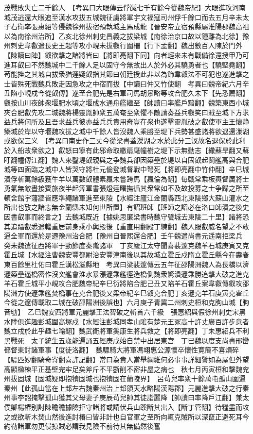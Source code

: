 茂戰敗失亡二千餘人　【考異曰大眼傳云俘馘七千有餘今從魏帝紀】大眼進攻河南城茂逃還大眼追至漢水攻拔五城魏征虜將軍宇文福寇司州俘千餘口而去五月辛未太子右衛率張惠紹等侵魏徐州拔宿預執城主馬成龍【晉安帝立宿預縣屬淮陽郡魏高祖以為南徐州治所】乙亥北徐州刺史昌義之拔梁城【南徐治京口故以鍾離為北徐】豫州刺史韋叡遣長史王超等攻小峴未拔叡行圍柵【行下孟翻】魏出數百人陳於門外【陳讀曰陣】叡欲擊之諸將皆曰【將即亮翻下同】向者輕來未有戰備徐還授甲乃可進耳叡曰不然魏城中二千餘人足以固守今無故出人於外必其驍勇者也【驍堅堯翻】苟能挫之其城自拔衆猶遲疑叡指其節曰朝廷授此非以為飾韋叡法不可犯也遂進擊之士皆殊死戰魏兵敗走因急攻之中宿而拔【中讀曰仲又竹使翻　考異曰魏帝紀六月辛丑陷小峴戍今從叡傳】遂至合肥先是右軍司馬胡景略等攻合肥久未下【先悉薦翻】叡按山川夜帥衆堰肥水頃之堰成水通舟艦繼至【帥讀曰率艦戶黯翻】魏築東西小城夾合肥叡先攻二城魏將楊靈胤帥衆五萬奄至衆懼不敵請奏益兵叡笑曰賊至城下方求益兵將何所及且吾求益兵彼亦益兵兵貴用奇豈在衆也遂擊靈胤破之叡使軍主王懷静築城於岸以守堰魏攻拔之城中千餘人皆沒魏人乘勝至堤下兵勢甚盛諸將欲退還漅湖或欲保三义　【考異曰南史作三丈今從梁書蓋漅湖之水於此分三汊故名退保於此利於入船故衆欲之】叡怒曰寧有此邪命取繖扇麾幢樹之堤下示無動志【繖蘇旱翻又蘇盱翻幢傳江翻】魏人來鑿堤叡親與之争魏兵卻因築壘於堤以自固叡起鬬艦高與合肥城等四面臨之城中人皆哭守將杜元倫登城督戰中弩死【將即亮翻中竹仲翻】辛巳城潰俘斬萬餘級獲牛羊以萬數叡體素羸未嘗跨馬【羸倫為翻】每戰常乘板輿督厲將士勇氣無敵晝接賓旅夜半起筭軍書張燈逹曙撫循其衆常如不及故投募之士争歸之所至頓舍館宇藩牆皆應準繩諸軍進至東陵【水經注廬江金蘭縣西北東陵鄉大蘇山灌水之所出也攷之諸志無金蘭縣未知何世所置】有詔班師【班師之詔必在洛口師潰之後史因書叡事而終言之】去魏城既近【據姚思廉梁書時魏守甓城去東陵二十里】諸將恐其追躡叡悉遣輜重居前身乘小輿殿後【重直用翻殿丁練翻】魏人服叡威名望之不敢逼全軍而還於是遷豫州治合肥【豫州自晉熙還合肥】壬午魏遣尚書元遥南拒梁兵　癸未魏遣征西將軍于勁節度秦隴諸軍　丁亥廬江太守聞喜裴邃克魏羊石城庚寅又克霍丘城【水經注曹魏安豐都尉治安豐津南後以其故城立霍丘戍隋立霍丘縣今在夀春東百餘里杜佑曰霍丘漢松滋縣地　考異曰梁裴邃傳云五年征邵陽洲魏人為長橋以濟邃築壘逼橋密作沒突艦會淮水暴漲邃乘艦徑造橋側魏衆驚潰邃乘勝追擊大破之進克羊石霍丘城平小峴攻合肥魏帝紀辛巳衍將陷合肥己丑又陷羊石霍丘案韋叡傳叡攻邵陽洲方使邃乘艦焚橋事在克合肥後又梁帝紀辛巳叡克合肥丁亥邃克羊石庚寅克霍丘今從之邃傳載取二城在破邵陽洲後誤也】六月庚子青冀二州刺史桓和克朐山城【胊音劬】　乙巳魏安西將軍元麗擊王法智破之斬首六千級　張惠紹與假徐州刺史宋黑水陸俱進趣彭城圍高塚戍【水經注彭城同孝山隂有楚元王冢高十許丈廣百許步意者魏立戍於此乎趣七喻翻】魏武衛將軍奚康生將兵救之【將即亮翻】丁未惠紹兵不利黑戰死　太子統生五歲能遍誦五經庚戌始自禁中出居東宫　丁巳魏以度支尚書邢巒都督東討諸軍事【度徒洛翻】　魏驃騎大將軍馮翊惠公源懷卒懷性寛簡不喜煩碎【驃匹妙翻騎奇寄翻喜許記翻】常曰為貴人當舉綱維何必事事詳細譬如為屋但外望高顯楹棟平正基壁完牢足矣斧斤不平斵削不密非屋之病也　秋七月丙寅桓和擊魏兖州拔固城【固城疑即抱犢固城也抱犢固在蘭陵界】　呂苟兒率衆十餘萬屯孤山圍逼秦州【此孤山當在上邽左右魏秦州治上邽領天水略陽漢陽郡】元麗進擊大破之行秦州事李韶掩擊孤山獲其父母妻子庚辰苟兒帥其徒詣麗降【帥讀曰率降戶江翻】兼太僕卿楊椿别討陳瞻瞻據險拒守諸將或請伏兵山蹊斷其出入【斷丁管翻】待糧盡而攻之或欲斬木焚山然後進討椿曰皆非計也自官軍之至所向輒克賊所以深竄正避死耳今約勒諸軍勿更侵掠賊必謂我見險不前待其無備然後奮